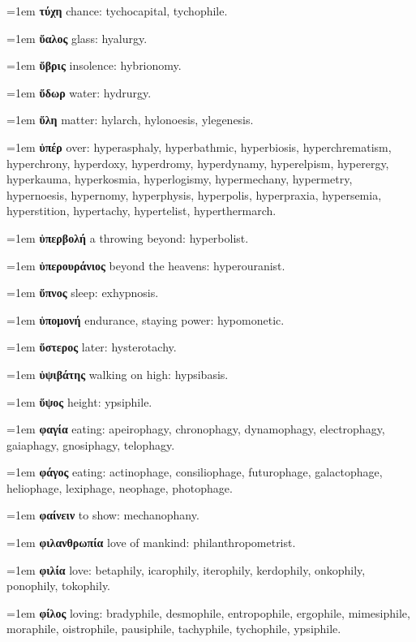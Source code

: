 \hangindent=1em \textbf{τύχη} chance: tychocapital, tychophile.\par
\hangindent=1em \textbf{ὕαλος} glass: hyalurgy.\par
\hangindent=1em \textbf{ὕβρις} insolence: hybrionomy.\par
\hangindent=1em \textbf{ὕδωρ} water: hydrurgy.\par
\hangindent=1em \textbf{ὕλη} matter: hylarch, hylonoesis, ylegenesis.\par
\hangindent=1em \textbf{ὑπέρ} over: hyperasphaly, hyperbathmic, hyperbiosis, hyperchrematism, hyperchrony, hyperdoxy, hyperdromy, hyperdynamy, hyperelpism, hyperergy, hyperkauma, hyperkosmia, hyperlogismy, hypermechany, hypermetry, hypernoesis, hypernomy, hyperphysis, hyperpolis, hyperpraxia, hypersemia, hyperstition, hypertachy, hypertelist, hyperthermarch.\par
\hangindent=1em \textbf{ὑπερβολή} a throwing beyond: hyperbolist.\par
\hangindent=1em \textbf{ὑπερουράνιος} beyond the heavens: hyperouranist.\par
\hangindent=1em \textbf{ὕπνος} sleep: exhypnosis.\par
\hangindent=1em \textbf{ὑπομονή} endurance, staying power: hypomonetic.\par
\hangindent=1em \textbf{ὕστερος} later: hysterotachy.\par
\hangindent=1em \textbf{ὑψιβάτης} walking on high: hypsibasis.\par
\hangindent=1em \textbf{ὕψος} height: ypsiphile.\par
\hangindent=1em \textbf{φαγία} eating: apeirophagy, chronophagy, dynamophagy, electrophagy, gaiaphagy, gnosiphagy, telophagy.\par
\hangindent=1em \textbf{φάγος} eating: actinophage, consiliophage, futurophage, galactophage, heliophage, lexiphage, neophage, photophage.\par
\hangindent=1em \textbf{φαίνειν} to show: mechanophany.\par
\hangindent=1em \textbf{φιλανθρωπία} love of mankind: philanthropometrist.\par
\hangindent=1em \textbf{φιλία} love: betaphily, icarophily, iterophily, kerdophily, onkophily, ponophily, tokophily.\par
\hangindent=1em \textbf{φίλος} loving: bradyphile, desmophile, entropophile, ergophile, mimesiphile, moraphile, oistrophile, pausiphile, tachyphile, tychophile, ypsiphile.\par
